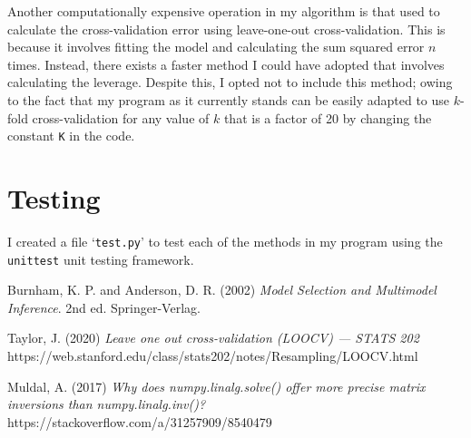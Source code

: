 \documentclass[onecolumn, 12pt, a4paper]{article}
\begin{document}
Another computationally expensive operation in my
algorithm is that used to calculate the cross-validation error 
using leave-one-out cross-validation.
This is because it involves
fitting the model and calculating the sum squared error
$n$ times. 
Instead, there exists a faster method I could have
adopted that involves calculating the leverage.
Despite this, I opted not to include this method; 
owing to the fact that my program as it
currently stands can be easily adapted to use $k$-fold
cross-validation for any value of $k$ that is a factor of 20
by changing the constant \texttt{K} in the code.

\section{Testing}

I created a file `\texttt{test.py}' to test each of the
methods in my program using the
\texttt{unittest} unit testing framework.

\begin{thebibliography}{9}

    Burnham, K. P. and Anderson, D. R. (2002)
    \textit{Model Selection and Multimodel Inference}.
    2nd ed. Springer-Verlag.

    Taylor, J. (2020)
    \textit{Leave one out cross-validation (LOOCV) --- STATS 202}
    https://web.stanford.edu/class/stats202/notes/Resampling/LOOCV.html

    Muldal, A. (2017)
    \textit{Why does numpy.linalg.solve() offer more precise matrix inversions than numpy.linalg.inv()?}
    https://stackoverflow.com/a/31257909/8540479



\end{thebibliography}
    
\end{document}
